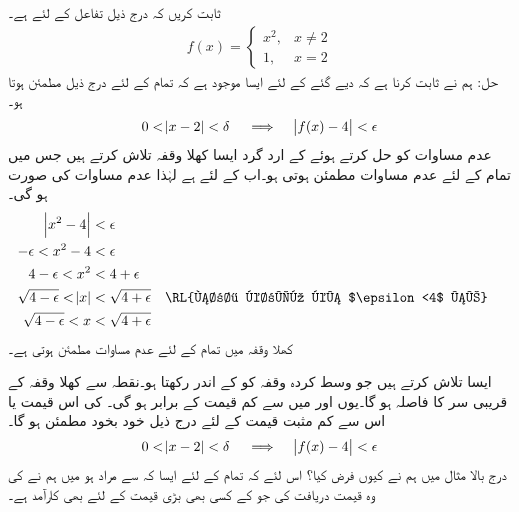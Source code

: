 ثابت کریں کہ درج ذیل تفاعل کے لئے  ہے۔
\begin{align*}
f(x)=\begin{cases}
x^2,&x\ne 2\\
1,&x=2
\end{cases}
\end{align*}
حل:\quad
ہم نے ثابت کرنا ہے کہ دیے گئے  کے لئے ایسا  موجود ہے کہ تمام  کے لئے درج ذیل مطمئن ہوتا ہو۔
\begin{align*}
0<\abs{x-2}<\delta\quad \implies \quad \abs{f(x)-4}<\epsilon
\end{align*}
\quad
عدم مساوات  کو حل کرتے ہوئے  کے ارد گرد ایسا کھلا وقفہ تلاش کرتے ہیں جس میں تمام  کے لئے عدم مساوات مطمئن ہوتی ہو۔اب  کے لئے  ہے لہٰذا عدم مساوات کی صورت  ہو گی۔ 
\begin{align*}
\abs{x^2-4}&<\epsilon\\
-\epsilon<x^2-4&<\epsilon\\
4-\epsilon<x^2&<4+\epsilon\\
\sqrt{4-\epsilon}<\abs{x}&<\sqrt{4+\epsilon}&&\text{\RL{فرض کریں کہ $\epsilon<4$ ہے}}\\
\sqrt{4-\epsilon}<x&<\sqrt{4+\epsilon}
\end{align*}
کھلا وقفہ  میں تمام  کے لئے عدم مساوات  مطمئن ہوتی ہے۔

\quad
ایسا  تلاش کرتے ہیں جو وسط کردہ وقفہ  کو  کے اندر رکھتا ہو۔نقطہ  سے کھلا وقفہ  کے قریبی سر کا فاصلہ  ہو گا۔یوں  اور   میں سے کم قیمت  کے برابر ہو گی۔ کی اس قیمت یا اس سے  کم مثبت قیمت کے لئے درج ذیل خود بخود مطمئن ہو گا۔
\begin{align*}
0<\abs{x-2}<\delta\quad \implies \quad \abs{f(x)-4}<\epsilon
\end{align*} 
درج بالا مثال میں ہم نے  کیوں فرض کیا؟ اس لئے کہ تمام  کے لئے ایسا  کہ  سے مراد  ہو میں ہم نے  کی وہ قیمت دریافت کی جو  کے کسی بھی  بڑی قیمت کے لئے بھی کارآمد ہے۔

